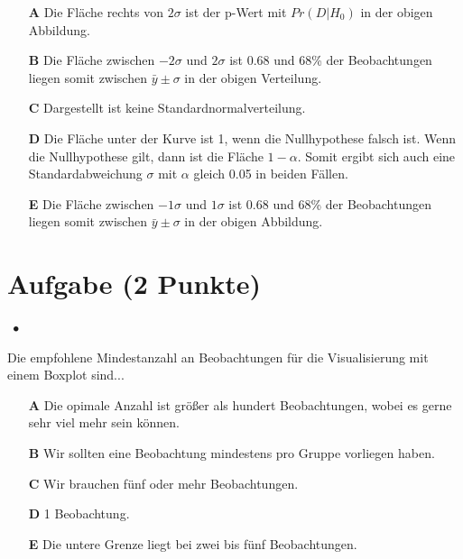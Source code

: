 \documentclass[a4paper, 9pt]{scrartcl}\usepackage[]{graphicx}\usepackage[]{xcolor}
\begin{document}
\begin{enumerate}
\item [\textbf{A} \msquare] Die Fläche rechts von $2\sigma$ ist der p-Wert mit $Pr(D|H_0)$ in der obigen Abbildung.
\item [\textbf{B} \msquare] Die Fläche zwischen $-2\sigma$ und $2\sigma$ ist 0.68 und 68\% der Beobachtungen liegen somit zwischen $\bar{y}\pm\sigma$ in der obigen Verteilung.
\item [\textbf{C} \msquare] Dargestellt ist keine Standardnormalverteilung.
\item [\textbf{D} \msquare] Die Fläche unter der Kurve ist 1, wenn die Nullhypothese falsch ist. Wenn die Nullhypothese gilt, dann ist die Fläche $1-\alpha$. Somit ergibt sich auch eine Standardabweichung $\sigma$ mit $\alpha$ gleich 0.05 in beiden Fällen.
\item [\textbf{E} \msquare] Die Fläche zwischen $-1\sigma$ und $1\sigma$ ist 0.68 und 68\% der Beobachtungen liegen somit zwischen $\bar{y}\pm\sigma$ in der obigen Abbildung.
\end{enumerate} 

\section{Aufgabe \hfill (2 Punkte)}

\ifcollection
\begin{flushright}
\tiny\vspace{-2Ex}
\textbf{\examinhaltstart}
\exammodulestatversuch $\;\bullet$
\exammodulebiostat
\vspace{-1Ex}
\end{flushright}
\fi




Die empfohlene Mindestanzahl an Beobachtungen für die Visualisierung mit einem Boxplot sind...



\begin{enumerate}
\item [\textbf{A} \msquare] Die opimale Anzahl ist größer als hundert Beobachtungen, wobei es gerne sehr viel mehr sein können.
\item [\textbf{B} \msquare] Wir sollten eine Beobachtung mindestens pro Gruppe vorliegen haben.
\item [\textbf{C} \msquare] Wir brauchen fünf oder mehr Beobachtungen.
\item [\textbf{D} \msquare] 1 Beobachtung.
\item [\textbf{E} \msquare] Die untere Grenze liegt bei zwei bis fünf Beobachtungen.
\end{enumerate}
\end{document}
